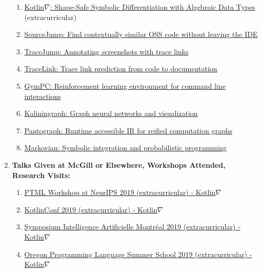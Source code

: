 \documentclass[11pt]{article}
\begin{document}
\begin{enumerate}
        \begin{enumerate}
            \item \href{https://github.com/breandan/kotlingrad}{Kotlin$\nabla$: Shape-Safe Symbolic Differentiation with Algebraic Data Types} (extracurricular)
            \item \href{https://github.com/acejump/sourcejump}{SourceJump: Find contextually similar OSS code without leaving the IDE}
            \item \href{https://github.com/acejump/tracejump}{TraceJump: Annotating screenshots with trace links}
            \item \href{https://github.com/breandan/tracelink}{TraceLink: Trace link prediction from code to documentation}
            \item \href{https://github.com/breandan/gym-pc}{GymPC: Reinforcement learning environment for command line interactions}
            \item \href{https://github.com/breandan/kaliningraph}{Kaliningraph: Graph neural networks and visualization}
            \item \href{https://github.com/breandan/pantograph}{Pantograph: Runtime accessible IR for reified computation graphs}
            \item \href{https://github.com/breandan/markovian}{Markovian: Symbolic integration and probabilistic programming}
        \end{enumerate}

        \item \textbf{Talks Given at McGill or Elsewhere, Workshops Attended, Research Visits:}

        \begin{enumerate}
            \item \href{https://program-transformations.github.io/}{PTML Workshop at NeurIPS 2019 (extracurricular) - Kotlin$\nabla$}
            \item \href{https://kotlinconf.com/2019/talks/}{KotlinConf 2019 (extracurricular) - Kotlin$\nabla$}
            \item \href{https://montrealaisymposium.wordpress.com/accepted-papers-2019/}{Symposium Intelligence Artificielle Montr\'eal 2019 (extracurricular) - Kotlin$\nabla$}
            \item \href{https://www.cs.uoregon.edu/research/summerschool/summer19/topics.php}{Oregon Programming Language Summer School 2019 (extracurricular) - Kotlin$\nabla$}
        \end{enumerate}


\end{enumerate}
\end{document}
